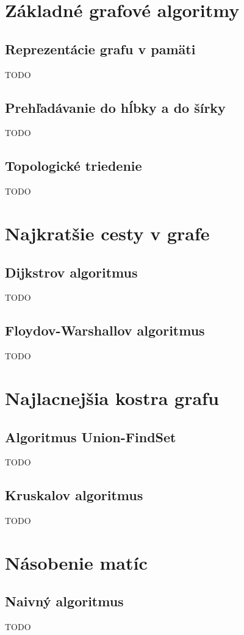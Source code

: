 \section{Základné grafové algoritmy}

	\subsection*{Reprezentácie grafu v pamäti} TODO
	\subsection*{Prehľadávanie do hĺbky a do šírky} TODO
	\subsection*{Topologické triedenie} TODO

\section{Najkratšie cesty v grafe}

	\subsection*{Dijkstrov algoritmus} TODO
	\subsection*{Floydov-Warshallov algoritmus} TODO

\section{Najlacnejšia kostra grafu}

	\subsection*{Algoritmus Union-FindSet} TODO
	\subsection*{Kruskalov algoritmus} TODO

\section{Násobenie matíc}

	\subsection*{Naivný algoritmus} TODO

